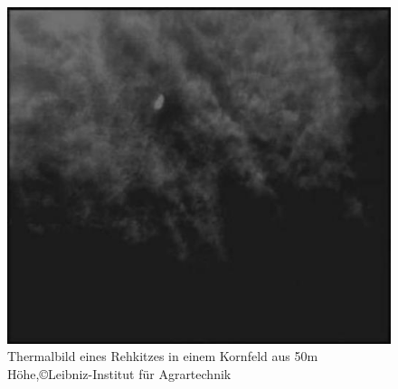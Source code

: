 \begin{figure}[p]
\begin{small}
\includegraphics[scale=0.8]{img/Rehkitz.jpg}
\caption{Thermalbild eines Rehkitzes in einem Kornfeld aus 50m Höhe,©Leibniz-Institut für Agrartechnik}
\label{rehkitz}
\end{small}
\end{figure}

